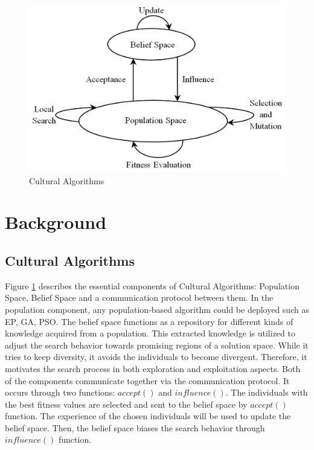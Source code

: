 \documentclass{llncs}
\begin{document}
\begin{figure}[h]
	\includegraphics[scale=0.11]{CA}
	\centering
	\caption{Cultural Algorithms \cite{kobti2013heterogeneous}}
	\label{ref:CA}
\end{figure}
\section{Background}
\subsection{Cultural Algorithms}
Figure \ref{ref:CA} describes the essential components of Cultural Algorithms: Population Space, Belief Space and a communication protocol between them. In the population component, any population-based algorithm could be deployed such as EP, GA, PSO. The belief space functions as a repository for different kinds of knowledge acquired from a population. This extracted knowledge is utilized to adjust the search behavior towards promising regions of a solution space. While it tries to keep diversity, it avoids the individuals to become divergent. Therefore, it motivates the search process in both exploration and exploitation aspects. Both of the components communicate together via the communication protocol. It occurs through two functions: $accept()$ and $influence()$. The individuals with the best fitness values are selected and sent to the belief space by $accept()$ function. The experience of the chosen individuals will be used to update the belief space. Then, the belief space biases the search behavior through $influence()$ function.
\end{document}
